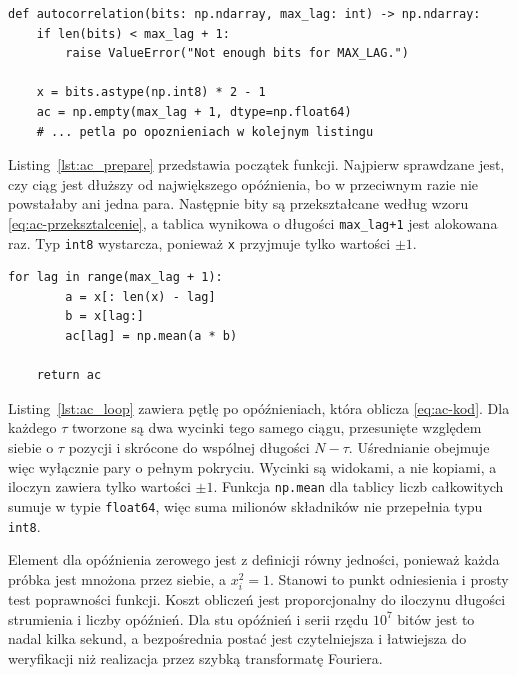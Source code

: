 \begin{lstlisting}[style=pycode,
    caption={Przekształcenie strumienia do postaci $-1/+1$ (\texttt{autocorrelation.py})},
    label={lst:ac_prepare}]
def autocorrelation(bits: np.ndarray, max_lag: int) -> np.ndarray:
    if len(bits) < max_lag + 1:
        raise ValueError("Not enough bits for MAX_LAG.")

    x = bits.astype(np.int8) * 2 - 1
    ac = np.empty(max_lag + 1, dtype=np.float64)
    # ... petla po opoznieniach w kolejnym listingu
\end{lstlisting}

Listing~\ref{lst:ac_prepare} przedstawia początek funkcji. Najpierw sprawdzane
jest, czy ciąg jest dłuższy od największego opóźnienia, bo w przeciwnym razie
nie powstałaby ani jedna para. Następnie bity są przekształcane według wzoru
\eqref{eq:ac-przeksztalcenie}, a tablica wynikowa o długości
\texttt{max\_lag+1} jest alokowana raz. Typ \texttt{int8} wystarcza, ponieważ
\texttt{x} przyjmuje tylko wartości $\pm 1$.

\begin{lstlisting}[style=pycode,
    caption={Obliczenie współczynników dla kolejnych opóźnień (\texttt{autocorrelation.py})},
    label={lst:ac_loop}]
    for lag in range(max_lag + 1):
        a = x[: len(x) - lag]
        b = x[lag:]
        ac[lag] = np.mean(a * b)

    return ac
\end{lstlisting}

Listing~\ref{lst:ac_loop} zawiera pętlę po opóźnieniach, która oblicza
\eqref{eq:ac-kod}. Dla każdego $\tau$ tworzone są dwa wycinki tego samego
ciągu, przesunięte względem siebie o $\tau$ pozycji i skrócone do wspólnej
długości $N-\tau$. Uśrednianie obejmuje więc wyłącznie pary o pełnym pokryciu.
Wycinki są widokami, a nie kopiami, a iloczyn zawiera tylko wartości $\pm 1$.
Funkcja \texttt{np.mean} dla tablicy liczb całkowitych sumuje w typie
\texttt{float64}, więc suma milionów składników nie przepełnia typu
\texttt{int8}.

Element dla opóźnienia zerowego jest z definicji równy jedności, ponieważ każda
próbka jest mnożona przez siebie, a $x_i^2 = 1$. Stanowi to punkt odniesienia
i prosty test poprawności funkcji. Koszt obliczeń jest proporcjonalny do
iloczynu długości strumienia i liczby opóźnień. Dla stu opóźnień i serii
rzędu $10^7$ bitów jest to nadal kilka sekund, a bezpośrednia postać jest
czytelniejsza i łatwiejsza do weryfikacji niż realizacja przez szybką
transformatę Fouriera.

